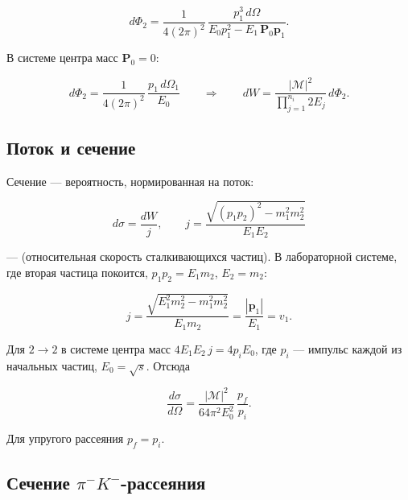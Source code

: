 \documentclass[../final.tex]{subfiles}
\begin{document}
\begin{equation*}
    d\Phi_2
    =
    \frac{1}{4(2\pi)^2}\,
    \frac{p_1^3\,d\Omega}
         {E_0p_1^2-E_1\,\mathbf P_0\mathbf p_1}.
\end{equation*}

В системе центра масс $\mathbf P_0=0$:

\begin{equation*}
    d\Phi_2
    =
    \frac{1}{4(2\pi)^2}\,
    \frac{p_1\,d\Omega_1}{E_0}
    \qquad\Longrightarrow\qquad
    dW
    =
    \frac{|\mathcal M|^2}{\displaystyle\prod_{j=1}^{n_i}2E_j}\,
    d\Phi_2.
\end{equation*}


\subsection{Поток и сечение}

Сечение --- вероятность, нормированная на поток:

\begin{equation*}
    d\sigma=\frac{dW}{j},
    \qquad
    j
    =
    \frac{\sqrt{\left(p_1p_2\right)^2-m_1^2m_2^2}}{E_1E_2}
\end{equation*}

--- 
(относительная скорость сталкивающихся частиц).
В лабораторной системе, где вторая частица покоится,
$p_1p_2=E_1m_2$, $E_2=m_2$:

\begin{equation*}
    j
    =
    \frac{\sqrt{E_1^2m_2^2-m_1^2m_2^2}}{E_1m_2}
    =
    \frac{|\mathbf p_1|}{E_1}
    =
    v_1.
\end{equation*}

Для $2\to2$ в системе центра масс
$4E_1E_2\,j=4p_iE_0$, где $p_i$ --- импульс каждой из
начальных частиц, $E_0=\sqrt s$. Отсюда

\begin{equation*}
    \frac{d\sigma}{d\Omega}
    =
    \frac{|\mathcal M|^2}{64\pi^2E_0^2}\,
    \frac{p_f}{p_i}.
\end{equation*}

Для упругого рассеяния $p_f=p_i$.


\subsection{Сечение \texorpdfstring{$\pi^-K^-$}{π⁻K⁻}-рассеяния}
\end{document}
